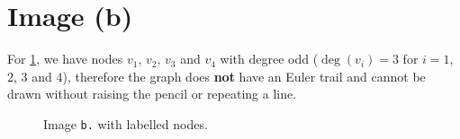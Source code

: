 \section{Image (b)}

\noindent
\begin{minipage}[t]{0.49\textwidth}

    For \cref{fig:graph-b}, we have nodes $v_1$, $v_2$, $v_3$ and $v_4$ with degree odd ($\deg(v_i) = 3$ for $i = 1$, $2$, $3$ and $4$), therefore the graph does \textbf{not} have an Euler trail and cannot be drawn without raising the pencil or repeating a line.

\end{minipage}%
\begin{minipage}[t]{0.5\textwidth}

    \begin{figure}[H]
        \centering
        

        \caption{Image \texttt{b.} with labelled nodes.}
        \label{fig:graph-b}
    \end{figure}

\end{minipage}
